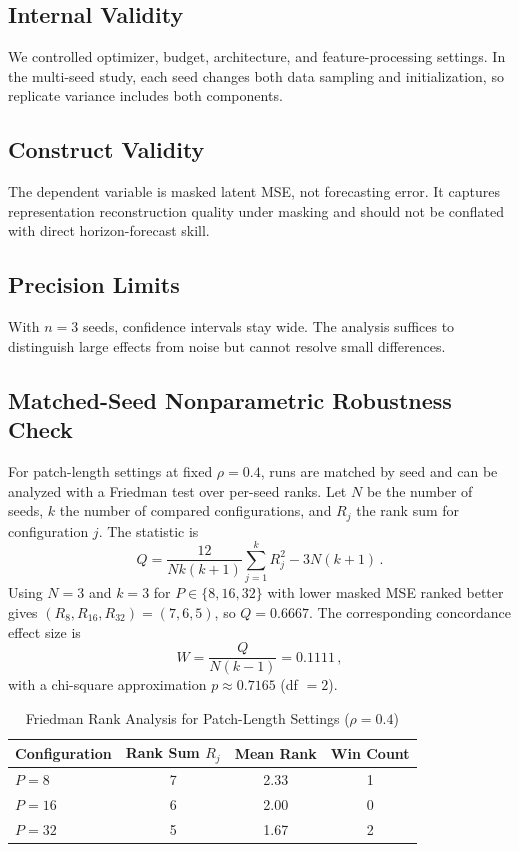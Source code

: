 \documentclass[journal]{IEEEtran}
\begin{document}
\subsection{Internal Validity}
We controlled optimizer, budget, architecture, and feature-processing settings. In the multi-seed study, each seed changes both data sampling and initialization, so replicate variance includes both components.

\subsection{Construct Validity}
The dependent variable is masked latent MSE, not forecasting error. It captures representation reconstruction quality under masking and should not be conflated with direct horizon-forecast skill.

\subsection{Precision Limits}
With $n=3$ seeds, confidence intervals stay wide. The analysis suffices to distinguish large effects from noise but cannot resolve small differences.

\subsection{Matched-Seed Nonparametric Robustness Check}
For patch-length settings at fixed $\rho=0.4$, runs are matched by seed and can be analyzed with a Friedman test over per-seed ranks. Let $N$ be the number of seeds, $k$ the number of compared configurations, and $R_j$ the rank sum for configuration $j$. The statistic is
\begin{equation}
Q = \frac{12}{Nk(k+1)}\sum_{j=1}^{k}R_j^2 - 3N(k+1)\,.
\label{eq:friedman}
\end{equation}
Using $N=3$ and $k=3$ for $P\in\{8,16,32\}$ with lower masked MSE ranked better gives $(R_8,R_{16},R_{32})=(7,6,5)$, so $Q=0.6667$. The corresponding concordance effect size is
\begin{equation}
W = \frac{Q}{N(k-1)} = 0.1111\,,
\label{eq:kendall_w}
\end{equation}
with a chi-square approximation $p\approx0.7165$ (df $=2$).

\begin{table}[t]
\caption{Friedman Rank Analysis for Patch-Length Settings ($\rho=0.4$)}
\label{tab:friedman_patch}
\centering
\begin{tabular}{lccc}
\toprule
Configuration & Rank Sum $R_j$ & Mean Rank & Win Count \\
\midrule
$P=8$  & 7 & 2.33 & 1 \\
$P=16$ & 6 & 2.00 & 0 \\
$P=32$ & 5 & 1.67 & 2 \\
\bottomrule
\end{tabular}
\end{table}
\end{document}
